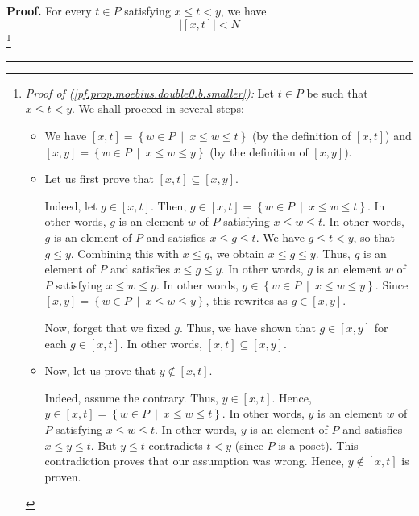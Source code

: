 \documentclass[numbers=enddot,12pt,final,onecolumn,notitlepage]{scrartcl}%
\theoremstyle{definition}
\newenvironment{proof}[1][Proof]{\noindent\textbf{#1.} }{\ \rule{0.5em}{0.5em}}
\newenvironment{verlong}{}{}
\begin{document}
\begin{verlong}
\begin{proof}
For every $t\in P$ satisfying $x\leq t<y$, we have%
\begin{equation}
\left\vert \left[  x,t\right]  \right\vert <N
\label{pf.prop.moebius.double0.b.smaller}%
\end{equation}
\footnote{\textit{Proof of (\ref{pf.prop.moebius.double0.b.smaller}):} Let
$t\in P$ be such that $x\leq t<y$. We shall proceed in several steps:
\par
\begin{itemize}
\item We have $\left[  x,t\right]  =\left\{  w\in P\ \mid\ x\leq w\leq
t\right\}  $ (by the definition of $\left[  x,t\right]  $) and $\left[
x,y\right]  =\left\{  w\in P\ \mid\ x\leq w\leq y\right\}  $ (by the
definition of $\left[  x,y\right]  $).
\par
\item Let us first prove that $\left[  x,t\right]  \subseteq\left[
x,y\right]  $.
\par
Indeed, let $g\in\left[  x,t\right]  $. Then, $g\in\left[  x,t\right]
=\left\{  w\in P\ \mid\ x\leq w\leq t\right\}  $. In other words, $g$ is an
element $w$ of $P$ satisfying $x\leq w\leq t$. In other words, $g$ is an
element of $P$ and satisfies $x\leq g\leq t$. We have $g\leq t<y$, so that
$g\leq y$. Combining this with $x\leq g$, we obtain $x\leq g\leq y$. Thus, $g$
is an element of $P$ and satisfies $x\leq g\leq y$. In other words, $g$ is an
element $w$ of $P$ satisfying $x\leq w\leq y$. In other words, $g\in\left\{
w\in P\ \mid\ x\leq w\leq y\right\}  $. Since $\left[  x,y\right]  =\left\{
w\in P\ \mid\ x\leq w\leq y\right\}  $, this rewrites as $g\in\left[
x,y\right]  $.
\par
Now, forget that we fixed $g$. Thus, we have shown that $g\in\left[
x,y\right]  $ for each $g\in\left[  x,t\right]  $. In other words, $\left[
x,t\right]  \subseteq\left[  x,y\right]  $.
\par
\item Now, let us prove that $y\notin\left[  x,t\right]  $.
\par
Indeed, assume the contrary. Thus, $y\in\left[  x,t\right]  $. Hence,
$y\in\left[  x,t\right]  =\left\{  w\in P\ \mid\ x\leq w\leq t\right\}  $. In
other words, $y$ is an element $w$ of $P$ satisfying $x\leq w\leq t$. In other
words, $y$ is an element of $P$ and satisfies $x\leq y\leq t$. But $y\leq t$
contradicts $t<y$ (since $P$ is a poset). This contradiction proves that our
assumption was wrong. Hence, $y\notin\left[  x,t\right]  $ is proven.
\par

\end{itemize}}
\end{proof}
\end{verlong}
\end{document}
